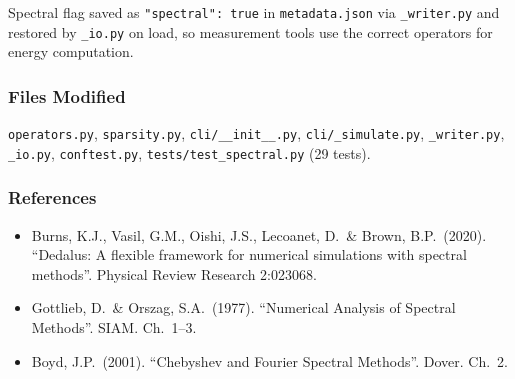 Spectral flag saved as \texttt{"spectral": true} in \texttt{metadata.json} via \texttt{\_writer.py}
and restored by \texttt{\_io.py} on load, so measurement tools use the correct
operators for energy computation.

\subsubsection{Files Modified}
\label{sec:spectral-files}

\texttt{operators.py}, \texttt{sparsity.py}, \texttt{cli/\_\_init\_\_.py}, \texttt{cli/\_simulate.py},
\texttt{\_writer.py}, \texttt{\_io.py}, \texttt{conftest.py}, \texttt{tests/test\_spectral.py} (29 tests).

\subsubsection{References}
\label{sec:spectral-references}

\begin{itemize}
  \item Burns, K.J., Vasil, G.M., Oishi, J.S., Lecoanet, D.\ \& Brown, B.P.\
    (2020). ``Dedalus: A flexible framework for numerical simulations with
    spectral methods''. Physical Review Research 2:023068.
  \item Gottlieb, D.\ \& Orszag, S.A.\ (1977). ``Numerical Analysis of Spectral
    Methods''. SIAM. Ch.\ 1--3.
  \item Boyd, J.P.\ (2001). ``Chebyshev and Fourier Spectral Methods''. Dover. Ch.\ 2.
\end{itemize}
